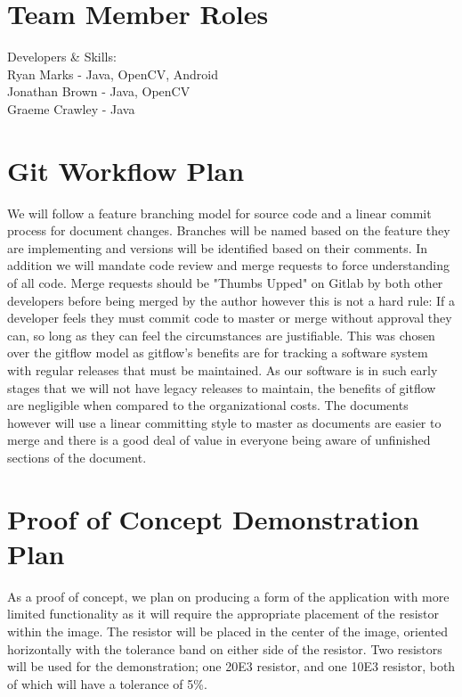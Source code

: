 \documentclass[12pt, titlepage]{article}
\begin{document}
\section{Team Member Roles}

Developers \& Skills: \\
Ryan Marks - Java, OpenCV, Android \\
Jonathan Brown - Java, OpenCV \\
Graeme Crawley - Java \\

\section{Git Workflow Plan}

We will follow a feature branching model for source code and a linear commit process for document changes. Branches will be named based on the feature they are implementing and versions will be identified based on their comments.
In addition we will mandate code review and merge requests to force understanding of all code.
Merge requests should be "Thumbs Upped" on Gitlab by both other developers before being merged by the author however this is not a hard rule:
If a developer feels they must commit code to master or merge without approval they can, so long as they can feel the circumstances are justifiable.
This was chosen over the gitflow model as gitflow's benefits are for tracking a software system with regular releases that must be maintained.
As our software is in such early stages that we will not have legacy releases to maintain, the benefits of gitflow are negligible when compared to the organizational costs.
The documents however will use a linear committing style to master as documents are easier to merge and there is a good deal of value in everyone being aware of unfinished sections of the document.

\section{Proof of Concept Demonstration Plan}
As a proof of concept, we plan on producing a form of the application with more limited functionality as it will require the appropriate placement of the resistor within the image. The resistor will be placed in the center of the image, oriented horizontally with the tolerance band on either side of the resistor. Two resistors will be used for the demonstration; one 20E3 resistor, and one 10E3 resistor, both of which will have a tolerance of 5\%.
\end{document}
